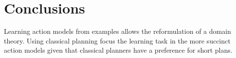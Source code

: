 \documentclass[letterpaper]{article} %
\begin{document}
\section{Conclusions}

Learning action models from examples allows the reformulation of a domain theory. Using classical planning focus the learning task in the more succinct action models given that classical planners have a preference for short plans.



\end{document}
